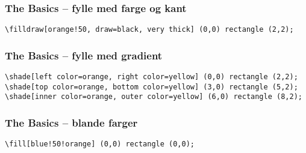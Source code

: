 \documentclass{beamer}
\begin{document}
\begin{frame}[fragile]
\frametitle{The Basics -- fylle med farge og kant}
\begin{center}
\end{center}


\vspace{20pt}

\begin{Verbatim}[fontsize=\footnotesize]
\filldraw[orange!50, draw=black, very thick] (0,0) rectangle (2,2);
\end{Verbatim}

\end{frame}

\begin{frame}[fragile]
\frametitle{The Basics -- fylle med gradient}
\begin{center}
\end{center}

\vspace{20pt}

\begin{Verbatim}[fontsize=\footnotesize]
\shade[left color=orange, right color=yellow] (0,0) rectangle (2,2);
\shade[top color=orange, bottom color=yellow] (3,0) rectangle (5,2);
\shade[inner color=orange, outer color=yellow] (6,0) rectangle (8,2);
\end{Verbatim}

\end{frame}

\begin{frame}[fragile]
\frametitle{The Basics -- blande farger}
\begin{center}
\end{center}

\vspace{20pt}

\begin{Verbatim}[fontsize=\small]
\fill[blue!50!orange] (0,0) rectangle (0,0);
\end{Verbatim}

\end{frame}
\end{document}
